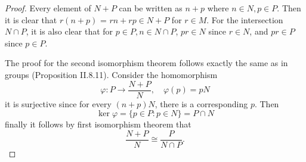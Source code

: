 \begin{proof}
Every element of $N+P$ can be written as $n+p$ where $n \in N, p \in P$. Then it is clear that $r(n+p)$ = $rn + rp \in N+P$ for $r \in M$. For the intersection $N \cap P$, it is also clear that for $p \in P, n \in N \cap P$, $pr \in N$ since $r \in N$, and $pr \in P$ since $p \in P$.

The proof for the second isomorphism theorem follows exactly the same as in groups (Proposition II.8.11). Consider the homomorphism
\[
\varphi: P \to \frac{N+P}{N}, \quad \varphi(p) = pN	
\]
it is surjective since for every $(n+p)N$, there is a corresponding $p$. Then
\[
\ker \varphi = \{p \in P : p \in N\} = P \cap N	
\]
finally it follows by first isomorphism theorem that 
\[
\frac{N+P}{N} \cong \frac{P}{N \cap P}.
\]
\end{proof}

\section{}

